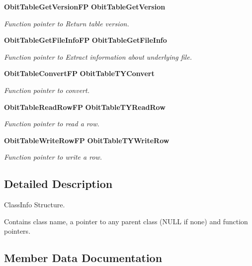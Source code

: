 \begin{CompactItemize}
{\bf Obit\-Table\-Get\-Version\-FP} {\bf Obit\-Table\-Get\-Version}
\begin{CompactList}\small\item\em Function pointer to Return table version. \item\end{CompactList}\item 
{\bf Obit\-Table\-Get\-File\-Info\-FP} {\bf Obit\-Table\-Get\-File\-Info}
\begin{CompactList}\small\item\em Function pointer to Extract information about underlying file. \item\end{CompactList}\item 
{\bf Obit\-Table\-Convert\-FP} {\bf Obit\-Table\-TYConvert}
\begin{CompactList}\small\item\em Function pointer to convert. \item\end{CompactList}\item 
{\bf Obit\-Table\-Read\-Row\-FP} {\bf Obit\-Table\-TYRead\-Row}
\begin{CompactList}\small\item\em Function pointer to read a row. \item\end{CompactList}\item 
{\bf Obit\-Table\-Write\-Row\-FP} {\bf Obit\-Table\-TYWrite\-Row}
\begin{CompactList}\small\item\em Function pointer to write a row. \item\end{CompactList}\end{CompactItemize}


\subsection{Detailed Description}
Class\-Info Structure. 

Contains class name, a pointer to any parent class (NULL if none) and function pointers. 



\subsection{Member Data Documentation}
